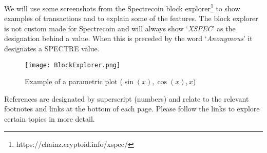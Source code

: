  

We will use some screenshots from the Spectrecoin block explorer\footnote{https://chainz.cryptoid.info/xspec/} to show examples of transactions and to explain some of the features. The block explorer is not custom made for Spectrecoin and will always show ‘\textit{XSPEC}’ as the designation behind a value. When this is preceded by the word ‘\textit{Anonymous}’ it designates a SPECTRE value. 

\begin{figure}[h]
	\caption{Example of a parametric plot ($\sin (x), \cos(x), x$)}
	\centering
	\texttt{[image: BlockExplorer.png]} 
\end{figure}


References are designated by superscript (numbers) and relate to the relevant footnotes and links at the 
bottom of each page. Please follow the links to explore certain topics in more detail. 